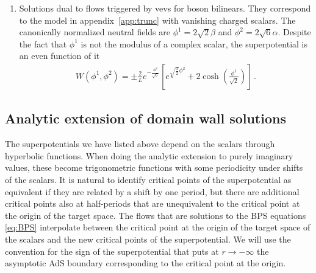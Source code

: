 \begin{enumerate}
\item Solutions dual to flows triggered by vevs for boson bilinears. They correspond to the model in appendix~\ref{app:trunc} with vanishing charged scalars. The canonically normalized neutral fields are $\phi^1=2\sqrt{2}\beta$ and $\phi^2=2\sqrt{6}\alpha$. Despite the fact that $\phi^1$ is not the modulus of a complex scalar, the superpotential is an even function of it 
\begin{align}
W(\phi^1,\phi^2)=\pm\frac{2}{L}e^{-\frac{\phi^2}{\sqrt{6}}}\left[e^{\sqrt{\frac{3}{2}}\phi^2}+2\cosh\left(\frac{\phi^1}{\sqrt{2}}\right)\right]\,.
\end{align}

\end{enumerate}

\subsection{Analytic extension of domain wall solutions}
\label{subsec:examples}

The superpotentials we have listed above depend on the scalars through hyperbolic functions. When doing the analytic extension to purely imaginary values, these become trigonometric functions with some periodicity under shifts of the scalars. It is natural to identify critical points of the superpotential as equivalent if they are related by a shift by one period, but there are additional critical points also at half-periods that are unequivalent to the critical point at the origin of the target space.
The flows that are solutions to the BPS equations \eqref{eq:BPS} interpolate between the critical point at the origin of the target space of the scalars and the new critical points of the superpotential. We will use the convention for the sign of the superpotential that puts at $r\to-\infty$ the asymptotic AdS boundary corresponding to the critical point at the origin.

